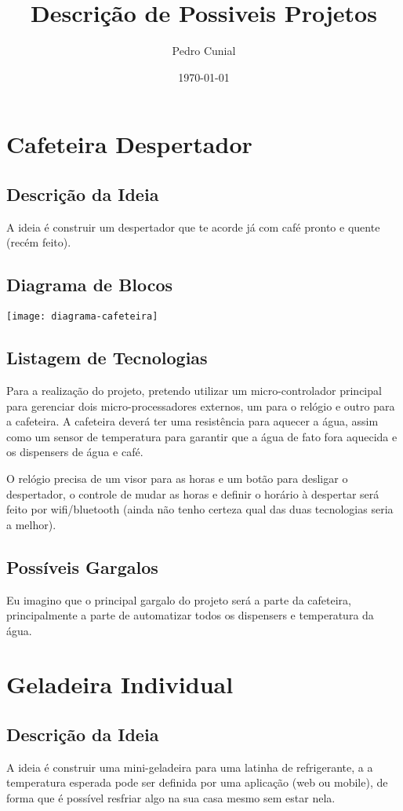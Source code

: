 \documentclass[11pt]{article}
\author{Pedro Cunial}
\date{\today}
\title{Descrição de Possiveis Projetos}
\begin{document}
\maketitle
\tableofcontents


\section{Cafeteira Despertador}
\subsection{Descrição da Ideia}
\label{sec:orgheadline1}
A ideia é construir um despertador que te acorde já com café pronto e quente
(recém feito).
\subsection{Diagrama de Blocos}
\label{sec:orgheadline2}
\texttt{[image: diagrama-cafeteira]}
\subsection{Listagem de Tecnologias}
\label{sec:orgheadline3}
Para a realização do projeto, pretendo utilizar um micro-controlador principal
para gerenciar dois micro-processadores externos, um para o relógio e outro
para a cafeteira. A cafeteira deverá ter uma resistência para aquecer a água,
assim como um sensor de temperatura para garantir que a água de fato fora
aquecida e os dispensers de água e café.

O relógio precisa de um visor para as horas e um botão para desligar o
despertador, o controle de mudar as horas e definir o horário à despertar será
feito por wifi/bluetooth (ainda não tenho certeza qual das duas tecnologias
seria a melhor).
\subsection{Possíveis Gargalos}
\label{sec:orgheadline4}
Eu imagino que o principal gargalo do projeto será a parte da cafeteira,
principalmente a parte de automatizar todos os dispensers e temperatura da
água.

\section{Geladeira Individual}
\subsection{Descrição da Ideia}
\label{sec:orgheadline6}
A ideia é construir uma mini-geladeira para uma latinha de refrigerante, a
a temperatura esperada pode ser definida por uma aplicação (web ou mobile), de
forma que é possível resfriar algo na sua casa mesmo sem estar nela.
\end{document}
